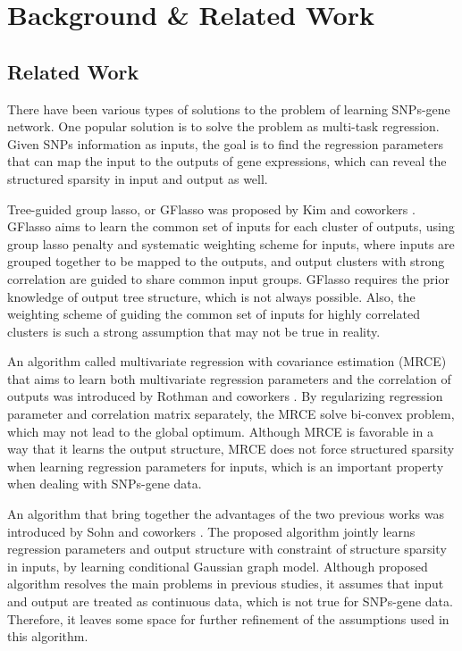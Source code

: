 \documentclass{article}
\begin{document}
\section{Background \& Related Work}
\label{LiteratureReview}





\subsection{Related Work}

There have been various types of solutions to the problem of learning SNPs-gene network. One popular solution is to solve the problem as multi-task regression.
Given SNPs information as inputs, the goal is to find the regression parameters that can map the input to the outputs of gene expressions, which can reveal the structured sparsity in input and output as well.




Tree-guided group lasso, or GFlasso was proposed by Kim and coworkers \cite{kim2010tree}.
GFlasso aims to learn the common set of inputs for each cluster of outputs, using group lasso penalty and systematic weighting scheme for inputs, where inputs are grouped together to be mapped to the outputs, and output clusters with strong correlation are guided to share common input groups.
GFlasso requires the prior knowledge of output tree structure, which is not always possible.
Also, the weighting scheme of guiding the common set of inputs for highly correlated clusters is such a strong assumption that may not be true in reality.


An algorithm called multivariate regression with covariance estimation (MRCE) that aims to learn both multivariate regression parameters and the correlation of outputs was introduced by Rothman and coworkers \cite{rothman2010sparse}.
By regularizing regression parameter and correlation matrix separately, the MRCE solve bi-convex problem, which may not lead to the global optimum. Although MRCE is favorable in a way that it learns the output structure, MRCE does not force structured sparsity when learning regression parameters for inputs, which is an important property when dealing with SNPs-gene data.


An algorithm that bring together the advantages of the two previous works \cite{kim2010tree} \cite{rothman2010sparse} was introduced by Sohn and coworkers \cite{sohn2012joint}. 
The proposed algorithm jointly learns regression parameters and output structure with constraint of structure sparsity in inputs, by learning conditional Gaussian graph model.
Although proposed algorithm resolves the main problems in previous studies, it assumes that input and output are treated as continuous data, which is not true for SNPs-gene data.
Therefore, it leaves some space for further refinement of the assumptions used in this algorithm.
\end{document}
